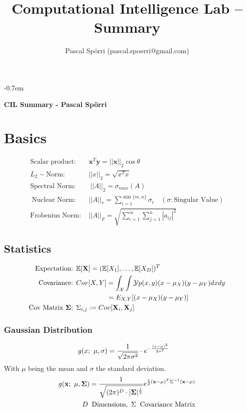 \documentclass[a4paper,11pt,landscape]{article}
\title{Computational Intelligence Lab -- Summary}
\author{Pascal Spörri (pascal.spoerri@gmail.com)}
\newcommand{\sectionline}{\noindent\makebox[\linewidth]{\rule{\columnwidth}{0.1pt}}}
\begin{document}
\raggedright
\footnotesize
\setlength{\columnseprule}{0.1mm}
\abovedisplayskip=0pt
\belowdisplayskip=0cm
\allowdisplaybreaks
\itemsep-0.7em
 
\begin{multicols}{3}
\textbf{CIL Summary - Pascal Spörri}
\vspace{-2mm}
\sectionline
\section{Basics}
\begin{align*}
 \text{Scalar product: }&\mathbf x^T \mathbf y = ||\mathbf x||_2 \cos \theta\\
 L_2-\text{Norm: } & ||x||_2 = \sqrt{x^Tx}\\
 \text{Spectral Norm: } &\ ||A||_2 = \sigma_{max}(A)\\\
 \text{Nuclear Norm: }& ||A||_* = \sum_{i=1}^{\min\{m,n\}} \sigma_i\quad (\sigma: \text{Singular Value})\\
 \text{Frobenius Norm: }& ||A||_F = \sqrt{\sum_{i=1}^m \sum_{j=1}^n |a_{ij}|^2}
\end{align*}

\vspace{-3mm}
\subsection{Statistics}
\begin{align*}
 \text{Expectation: }&\mathbb E[\mathbf X] = (\mathbb E[X_1], \ldots, \mathbb E[X_D])^T\\
 \text{Covariance: } &Cov[X,Y] = \int_{\mathcal X}\int{\mathcal Y} p(x,y)(x - \mu_X)(y - \mu_Y) dxdy\\
 &\qquad \qquad \, \ = \mathbb \mathcal E_{X,Y}[(x-\mu_X)(y-\mu_Y)]\\
 \text{Cov Matrix $\mathbf \Sigma$: } & \Sigma_{i,j} := Cov[\mathbf X_i, \mathbf X_j]
\end{align*}

\subsubsection{Gaussian Distribution}
\vspace{-2mm}
\begin{align*}
 g(x;\ \mu,\sigma) &= {1\over \sqrt{2\pi \sigma^2}} \cdot e^{- {(x-\mu)^2 \over 2 \sigma^2}}
\end{align*}
With $\mu$ being the mean and $\sigma$ the standard deviation.
\begin{align*}
 g(\mathbf x;\ \mathbf \mu, \mathbf \Sigma) = {1\over \sqrt{(2\pi)^D \cdot |\mathbf \Sigma|^{1\over 2}}} e^{\frac{1}{2} (\mathbf x - \mathbf \mu)^T  \Sigma^{-1}  (\mathbf x - \mathbf \mu)}\\
 D\:\ \text{Dimensions},\ \Sigma\:\ \text{Covariance Matrix}
\end{align*}

\end{multicols}
\end{document}
